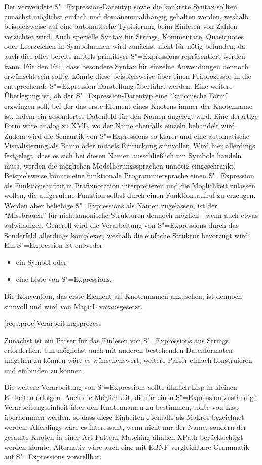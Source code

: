 \documentclass[11pt, a4paper, bibgerm]{scrbook}
\newcommand\lsection{}
\newcommand{\sexp}{S"=Expression}
\newcommand{\sexps}{S"=Expressions}
\begin{document}
Der verwendete \sexp{}-Datentyp sowie die konkrete Syntax sollten
zunächst möglichst einfach und domänenunabhängig gehalten werden,
weshalb beispielsweise auf eine automatische Typisierung beim Einlesen
von Zahlen verzichtet wird. Auch spezielle Syntax für Strings,
Kommentare, Quasiquotes oder Leerzeichen in Symbolnamen wird zunächst
nicht für nötig befunden, da auch dies alles bereits mittels primitiver
\sexps{} repräsentiert werden kann. Für den Fall, dass besondere Syntax
für einzelne Anwendungen dennoch erwünscht sein sollte, könnte diese
beispielsweise über einen Präprozessor in die entsprechende
\sexp{}-Darstellung überführt werden. Eine weitere Überlegung ist, ob der
\sexp{}-Datentyp eine "`kanonische Form"' erzwingen soll, bei der das
erste Element eines Knotens immer der Knotenname ist, indem ein
gesondertes Datenfeld für den Namen angelegt wird. Eine derartige Form
wäre analog zu XML, wo der Name ebenfalls einzeln behandelt wird. Zudem
wird die Semantik von \sexps{} so klarer und eine automatische
Visualisierung als Baum oder mittels Einrückung sinnvoller.  Wird hier
allerdings festgelegt, dass es sich bei diesen Namen ausschließlich um
Symbole handeln muss, werden die möglichen Modellierungssprachen unnötig
eingeschränkt. Beispielsweise könnte eine funktionale Programmiersprache
einen \sexp{} als Funktionsaufruf in Präfixnotation interpretieren und
die Möglichkeit zulassen wollen, die aufgerufene Funktion selbst durch
einen Funktionsaufruf zu erzeugen. Werden aber beliebige \sexps{} als
Namen zugelassen, ist der "`Missbrauch"' für nichtkanonische Strukturen
dennoch möglich - wenn auch etwas aufwändiger. Generell wird die
Verarbeitung von \sexps{} durch das Sonderfeld allerdings komplexer,
weshalb die einfache Struktur bevorzugt wird: Ein \sexp{} ist entweder 
\begin{itemize}
\item ein Symbol oder 
\item eine Liste von \sexps{}.
\end{itemize}
Die Konvention, das erste Element als Knotennamen anzusehen, ist dennoch
sinnvoll und wird von MagicL vorausgesetzt.

\lsection[reqs:proc]{Verarbeitungsprozess}

Zunächst ist ein Parser für das Einlesen von \sexps{} aus Strings
erforderlich. Um möglichst auch mit anderen bestehenden Datenformaten
umgehen zu können wäre es wünschenswert, weitere Parser einfach
konstruieren und einbinden zu können.

Die weitere Verarbeitung von \sexps{} sollte ähnlich Lisp in kleinen
Einheiten erfolgen. Auch die Möglichkeit, die für einen \sexp{}
zuständige Verarbeitungseinheit über den Knotennamen zu bestimmen,
sollte von Lisp übernommen werden, so dass diese Einheiten ebenfalls als
Makros bezeichnet werden. Allerdings wäre es interessant, wenn nicht nur
der Name, sondern der gesamte Knoten in einer Art Pattern-Matching
ähnlich XPath berücksichtigt werden könnte. Alternativ wäre auch eine
mit EBNF\cite[S.43f]{EBNF} vergleichbare Grammatik auf \sexps{}
vorstellbar.
\end{document}
